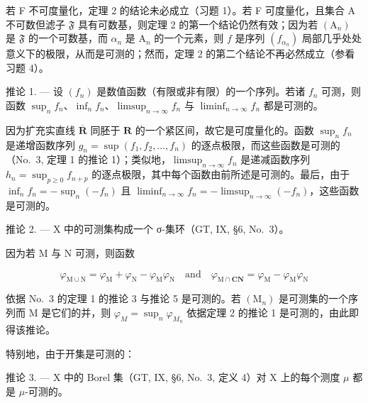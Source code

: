 若 F 不可度量化，定理 2 的结论未必成立（习题 1）。若 F 可度量化，且集合 A 不可数但滤子 \(\mathfrak{F}\) 具有可数基，则定理 2 的第一个结论仍然有效；因为若 \((\mathrm{A}_n)\) 是 \(\mathfrak{F}\) 的一个可数基，而 \(\alpha_{n}\) 是 \(\mathrm{A}_n\) 的一个元素，则 \(f\) 是序列 \((f_{\alpha_n})\) 局部几乎处处意义下的极限，从而是可测的；然而，定理 2 的第二个结论不再必然成立（参看习题 4）。

推论 1. --- 设 \((f_n)\) 是数值函数（有限或非有限）的一个序列。若诸 \(f_n\) 可测，则函数 \(\sup_{n} f_n\)、\(\inf_{n} f_n\)、\(\limsup_{n \to \infty} f_n\) 与 \(\liminf_{n \to \infty} f_n\) 都是可测的。

因为扩充实直线 \(\overline{\mathbf{R}}\) 同胚于 \(\mathbf{R}\) 的一个紧区间，故它是可度量化的。函数 \(\sup_{n} f_n\) 是递增函数序列 \(g_n = \sup(f_1, f_2, \ldots, f_n)\) 的逐点极限，而这些函数是可测的（No.~3, 定理 1 的推论 1）；类似地，\(\limsup_{n \to \infty} f_n\) 是递减函数序列 \(h_n = \sup_{p \geqslant 0} f_{n+p}\) 的逐点极限，其中每个函数由前所述是可测的。最后，由于 \(\inf_{n} f_n = -\sup_{n} (-f_n)\) 且 \(\liminf_{n \to \infty} f_n = -\limsup_{n \to \infty} (-f_n)\)，这些函数是可测的。

推论 2. --- X 中的可测集构成一个 σ-集环（GT, IX, §6, No.~3）。

因为若 M 与 N 可测，则函数

\[
\varphi_ {\mathrm{M} \cup \mathrm{N}} = \varphi_ {\mathrm{M}} + \varphi_ {\mathrm{N}} - \varphi_ {\mathrm{M}} \varphi_ {\mathrm{N}} \quad \text {and} \quad \varphi_ {\mathrm{M} \cap \mathbf {C N}} = \varphi_ {\mathrm{M}} - \varphi_ {\mathrm{M}} \varphi_ {\mathrm{N}}
\]

依据 No.~3 的定理 1 的推论 3 与推论 5 是可测的。若 \((\mathrm{M}_{n})\) 是可测集的一个序列而 M 是它们的并，则 \(\varphi_{M} = \sup_{n} \varphi_{M_{n}}\) 依据定理 2 的推论 1 是可测的，由此即得该推论。

特别地，由于开集是可测的：

推论 3. --- X 中的 Borel 集（GT, IX, §6, No.~3, 定义 4）对 X 上的每个测度 \(\mu\) 都是 \(\mu\)-可测的。

